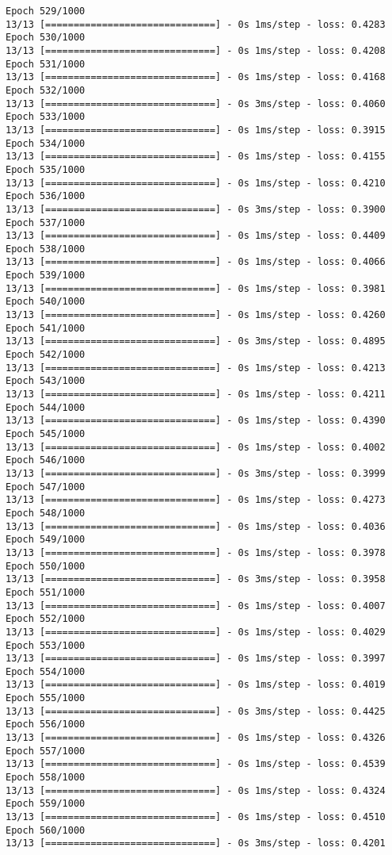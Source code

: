 \documentclass[11pt]{article}
\begin{document}
\begin{Verbatim}[commandchars=\\\{\}]
Epoch 529/1000
13/13 [==============================] - 0s 1ms/step - loss: 0.4283
Epoch 530/1000
13/13 [==============================] - 0s 1ms/step - loss: 0.4208
Epoch 531/1000
13/13 [==============================] - 0s 1ms/step - loss: 0.4168
Epoch 532/1000
13/13 [==============================] - 0s 3ms/step - loss: 0.4060
Epoch 533/1000
13/13 [==============================] - 0s 1ms/step - loss: 0.3915
Epoch 534/1000
13/13 [==============================] - 0s 1ms/step - loss: 0.4155
Epoch 535/1000
13/13 [==============================] - 0s 1ms/step - loss: 0.4210
Epoch 536/1000
13/13 [==============================] - 0s 3ms/step - loss: 0.3900
Epoch 537/1000
13/13 [==============================] - 0s 1ms/step - loss: 0.4409
Epoch 538/1000
13/13 [==============================] - 0s 1ms/step - loss: 0.4066
Epoch 539/1000
13/13 [==============================] - 0s 1ms/step - loss: 0.3981
Epoch 540/1000
13/13 [==============================] - 0s 1ms/step - loss: 0.4260
Epoch 541/1000
13/13 [==============================] - 0s 3ms/step - loss: 0.4895
Epoch 542/1000
13/13 [==============================] - 0s 1ms/step - loss: 0.4213
Epoch 543/1000
13/13 [==============================] - 0s 1ms/step - loss: 0.4211
Epoch 544/1000
13/13 [==============================] - 0s 1ms/step - loss: 0.4390
Epoch 545/1000
13/13 [==============================] - 0s 1ms/step - loss: 0.4002
Epoch 546/1000
13/13 [==============================] - 0s 3ms/step - loss: 0.3999
Epoch 547/1000
13/13 [==============================] - 0s 1ms/step - loss: 0.4273
Epoch 548/1000
13/13 [==============================] - 0s 1ms/step - loss: 0.4036
Epoch 549/1000
13/13 [==============================] - 0s 1ms/step - loss: 0.3978
Epoch 550/1000
13/13 [==============================] - 0s 3ms/step - loss: 0.3958
Epoch 551/1000
13/13 [==============================] - 0s 1ms/step - loss: 0.4007
Epoch 552/1000
13/13 [==============================] - 0s 1ms/step - loss: 0.4029
Epoch 553/1000
13/13 [==============================] - 0s 1ms/step - loss: 0.3997
Epoch 554/1000
13/13 [==============================] - 0s 1ms/step - loss: 0.4019
Epoch 555/1000
13/13 [==============================] - 0s 3ms/step - loss: 0.4425
Epoch 556/1000
13/13 [==============================] - 0s 1ms/step - loss: 0.4326
Epoch 557/1000
13/13 [==============================] - 0s 1ms/step - loss: 0.4539
Epoch 558/1000
13/13 [==============================] - 0s 1ms/step - loss: 0.4324
Epoch 559/1000
13/13 [==============================] - 0s 1ms/step - loss: 0.4510
Epoch 560/1000
13/13 [==============================] - 0s 3ms/step - loss: 0.4201

\end{Verbatim}
\end{document}
